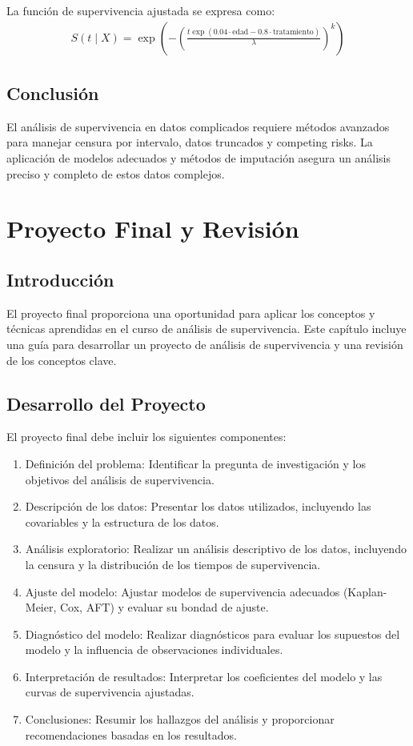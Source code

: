 \documentclass[a4paper]{report} %
\begin{document}
La funci\'on de supervivencia ajustada se expresa como:
\begin{eqnarray*}
S(t \mid X) = \exp\left(-\left(\frac{t \exp(0.04 \cdot \text{edad} - 0.8 \cdot \text{tratamiento})}{\lambda}\right)^k\right)
\end{eqnarray*}

\section{Conclusi\'on}
El an\'alisis de supervivencia en datos complicados requiere m\'etodos avanzados para manejar censura por intervalo, datos truncados y competing risks. La aplicaci\'on de modelos adecuados y m\'etodos de imputaci\'on asegura un an\'alisis preciso y completo de estos datos complejos.


\chapter{Proyecto Final y Revisi\'on}
\section{Introducci\'on}
El proyecto final proporciona una oportunidad para aplicar los conceptos y t\'ecnicas aprendidas en el curso de an\'alisis de supervivencia. Este cap\'itulo incluye una gu\'ia para desarrollar un proyecto de an\'alisis de supervivencia y una revisi\'on de los conceptos clave.

\section{Desarrollo del Proyecto}
El proyecto final debe incluir los siguientes componentes:
\begin{enumerate}
    \item Definici\'on del problema: Identificar la pregunta de investigaci\'on y los objetivos del an\'alisis de supervivencia.
    \item Descripci\'on de los datos: Presentar los datos utilizados, incluyendo las covariables y la estructura de los datos.
    \item An\'alisis exploratorio: Realizar un an\'alisis descriptivo de los datos, incluyendo la censura y la distribuci\'on de los tiempos de supervivencia.
    \item Ajuste del modelo: Ajustar modelos de supervivencia adecuados (Kaplan-Meier, Cox, AFT) y evaluar su bondad de ajuste.
    \item Diagn\'ostico del modelo: Realizar diagn\'osticos para evaluar los supuestos del modelo y la influencia de observaciones individuales.
    \item Interpretaci\'on de resultados: Interpretar los coeficientes del modelo y las curvas de supervivencia ajustadas.
    \item Conclusiones: Resumir los hallazgos del an\'alisis y proporcionar recomendaciones basadas en los resultados.
\end{enumerate}
\end{document}
